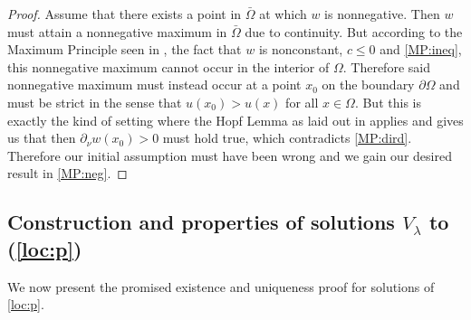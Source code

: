 \documentclass[12pt,a4paper]{amsart}
\theoremstyle{definition}
\theoremstyle{remark}
\numberwithin{equation}{section}
\numberwithin{theorem}{section}
\begin{document}
\begin{proof}
	Assume that there exists a point in $\bar{\Omega}$ at which $w$ is nonnegative. Then $w$ must attain a nonnegative maximum in $\bar\Omega$ due to continuity. But according to the Maximum Principle seen in \cite[Lemma 3.5]{GiT}, the fact that $w$ is nonconstant, $c \leq 0$ and \eqref{MP:ineq}, this nonnegative maximum cannot occur in the interior of $\Omega$. Therefore said nonnegative maximum must instead occur at a point $x_0$ on the boundary $\partial \Omega$ and must be strict in the sense that $u(x_0) > u(x)$ for all $x \in \Omega$. But this is exactly the kind of setting where the Hopf Lemma as laid out in \cite[Lemma 3.4]{GiT} applies and gives us that then $\partial_{\nu}w(x_0) > 0$ must hold true, which contradicts \eqref{MP:dird}. Therefore our initial assumption must have been wrong and we gain our desired result in \eqref{MP:neg}. 
\end{proof}

\subsection{Construction and properties of solutions $V_\lambda$ to (\ref{loc:p})}

We now present the promised existence and uniqueness proof for solutions of \eqref{loc:p}. 
\end{document}

